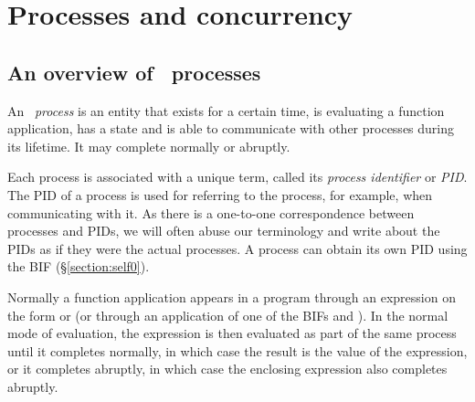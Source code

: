%
%
%
%
%
%
%

\chapter{Processes and concurrency}

\label{chapter:processes}

\section{An overview of \Erlang\ processes}

\label{section:spawning-processes}

An \Erlang\ \emph{process} is an entity that exists for a certain
time, is evaluating a function application, has a state and is able to
communicate with other processes during its lifetime.  It may complete
normally or abruptly.

Each process is associated with a unique term, called its \emph{process
identifier} or \emph{PID}.  The PID of a process is used for referring
to the process, for example, when communicating with it. As there is
a one-to-one correspondence between processes and PIDs, we will often
abuse our terminology and write about the PIDs as if they were the
actual processes. A process can obtain its own PID using the BIF
 (\S\ref{section:self0}).

Normally a function application appears in a program through an
expression on the form  or
 (or through an application
of one of the BIFs  and ).
In the normal mode of
evaluation, the expression is then evaluated as part of the same
process until it completes
normally, in which case the result is the value of the expression,
or it completes abruptly, in which case the enclosing expression also
completes abruptly.

